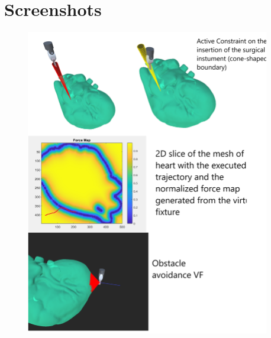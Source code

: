 \documentclass{article}
\begin{document}
\section*{Screenshots}
\begin{figure}[h!] \begin{small} \begin{center}
    \includegraphics[width=0.95\textwidth]{Scene.png} \end{center}
    \label{fig:} \end{small} \end{figure}
\end{document}
